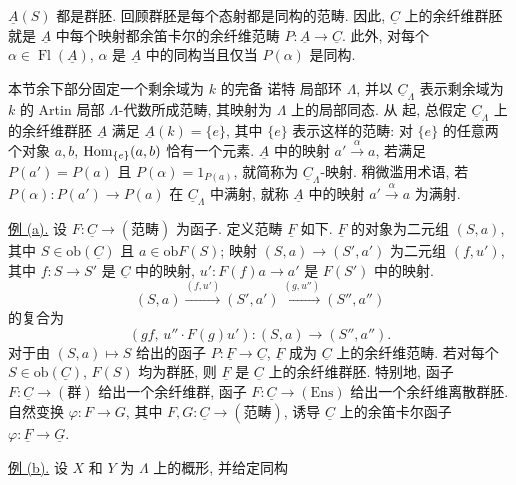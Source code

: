 
$\underline A(S)$ 都是群胚. 回顾群胚是每个态射都是同构的范畴.
因此, $\underline C$ 上的余纤维群胚就是 $\underline A$ 中每个映射都余笛卡尔的余纤维范畴
$P:\underline A\longrightarrow\underline C$. 此外, 对每个
$\alpha\in\operatorname{Fl}(\underline A)$, $\alpha$ 是 $\underline A$
中的同构当且仅当 $P(\alpha)$ 是同构.

本节余下部分固定一个剩余域为 $k$ 的完备 诺特 局部环 $\Lambda$,
并以 $\underline C_\Lambda$ 表示剩余域为 $k$ 的 Artin 局部
$\Lambda$-代数所成范畴, 其映射为 $\Lambda$ 上的局部同态.
从  起, 总假定
$\underline C_\Lambda$ 上的余纤维群胚 $\underline A$ 满足
$\underline A(k)=\{e\}$, 其中 $\{e\}$ 表示这样的范畴: 对 $\{e\}$ 的任意两个对象
$a,b$, $\operatorname{Hom}_{\{e\}}(a,b)$ 恰有一个元素.
$\underline A$ 中的映射 $a'\xrightarrow{\alpha}a$, 若满足
$P(a')=P(a)$ 且 $P(\alpha)=1_{P(a)}$, 就简称为
$\underline C_\Lambda$-映射. 稍微滥用术语, 若
$P(\alpha):P(a')\longrightarrow P(a)$ 在 $\underline C_\Lambda$
中满射, 就称 $\underline A$ 中的映射 $a'\xrightarrow{\alpha}a$ 为满射.

\underline{例 (a).}
设 $F:\underline C\longrightarrow(\text{范畴})$ 为函子.
定义范畴 $\underline F$ 如下. $\underline F$ 的对象为二元组 $(S,a)$,
其中 $S\in\mathrm{ob}(\underline C)$ 且 $a\in\mathrm{ob}F(S)$;
映射 $(S,a)\longrightarrow(S',a')$ 为二元组 $(f,u')$, 其中
$f:S\longrightarrow S'$ 是 $\underline C$ 中的映射,
$u':F(f)a\longrightarrow a'$ 是 $F(S')$ 中的映射.
\[
 (S,a)\xrightarrow{(f,u')}(S',a')
 \xrightarrow{(g,u'')}(S'',a'')
\]
的复合为
\[
 (gf,\,u''\mathbin{\cdot}F(g)u'):(S,a)\longrightarrow(S'',a'').
\]
对于由 $(S,a)\longmapsto S$ 给出的函子
$P:\underline F\longrightarrow\underline C$, $\underline F$
成为 $\underline C$ 上的余纤维范畴. 若对每个
$S\in\mathrm{ob}(\underline C)$, $F(S)$ 均为群胚,
则 $\underline F$ 是 $\underline C$ 上的余纤维群胚.
特别地, 函子 $F:\underline C\longrightarrow(\text{群})$
给出一个余纤维群, 函子 $F:\underline C\longrightarrow(\mathrm{Ens})$
给出一个余纤维离散群胚. 自然变换 $\varphi:F\longrightarrow G$,
其中 $F,G:\underline C\longrightarrow(\text{范畴})$, 诱导
$\underline C$ 上的余笛卡尔函子
$\varphi:\underline F\longrightarrow\underline G$.

\underline{例 (b).}
设 $X$ 和 $Y$ 为 $\Lambda$ 上的概形, 并给定同构


